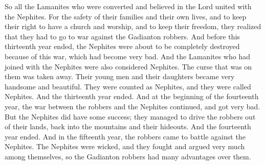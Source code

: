 So all the Lamanites who were converted and believed in the Lord united with the Nephites. For the safety of their families and their own lives, and to keep their right to have a church and worship, and to keep their freedom, they realized that they had to go to war against the Gadianton robbers.
\bverse \iffalse And it came to pass that before this thirteenth year had passed away the Nephites were threatened with utter destruction because of this war, which had become exceedingly sore. \fi
And before this thirteenth year ended, the Nephites were about to be completely destroyed because of this war, which had become very bad.
\bverse \iffalse And it came to pass that those Lamanites who had united with the Nephites were numbered among the Nephites; \fi
And the Lamanites who had joined with the Nephites were also considered Nephites.
\bverse \iffalse And their curse was taken from them, and their skin became white like unto the Nephites; \fi
The curse that was on them was taken away.
\bverse \iffalse And their young men and their daughters became exceedingly fair, and they were numbered among the Nephites, and were called Nephites. And thus ended the thirteenth year. \fi
Their young men and their daughters became very handsome and beautiful. They were counted as Nephites, and they were called Nephites. And the thirteenth year ended.
\bverse \iffalse And it came to pass in the commencement of the fourteenth year, the war between the robbers and the people of Nephi did continue and did become exceedingly sore; nevertheless, the people of Nephi did gain some advantage of the robbers, insomuch that they did drive them back out of their lands into the mountains and into their secret places. \fi
And at the beginning of the fourteenth year, the war between the robbers and the Nephites continued, and got very bad. But the Nephites did have some success; they managed to drive the robbers out of their lands, back into the mountains and their hideouts.
\bverse \iffalse And thus ended the fourteenth year. And in the fifteenth year they did come forth against the people of Nephi; and because of the wickedness of the people of Nephi, and their many contentions and dissensions, the Gadianton robbers did gain many advantages over them. \fi
And the fourteenth year ended. And in the fifteenth year, the robbers came to battle against the Nephites. The Nephites were wicked, and they fought and argued very much among themselves, so the Gadianton robbers had many advantages over them.
